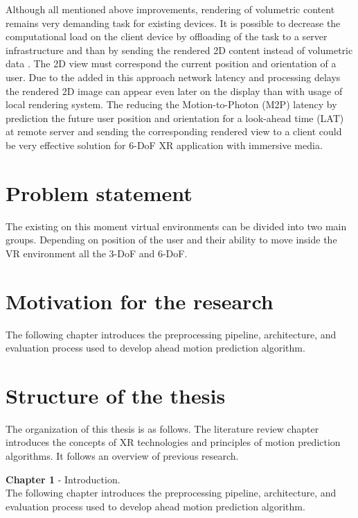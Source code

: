 Although all mentioned above improvements, rendering of volumetric content remains very demanding task for existing devices. It is possible to decrease the computational load on the client device by offloading of the task to a server infrastructure and than by sending the rendered 2D content instead of volumetric data \cite{serhan_cloud_streaming}. The 2D view must correspond the current position and orientation of a user. Due to the added in this approach network latency and processing delays the rendered 2D image can appear even later on the display than with usage of local rendering system. The reducing the Motion-to-Photon (M2P) latency by prediction the future user position and orientation for a look-ahead time (LAT) at remote server and sending the corresponding rendered view to a client could be very effective solution for 6-DoF XR application with immersive media. 


\section{Problem statement}
\label{sec:intro:problem}
The existing on this moment virtual environments can be divided into two main groups. Depending on position of the user and their ability to move inside the VR environment all the 3-DoF and 6-DoF. 

\section{Motivation for the research}
\label{sec:intro:motivation}
The following chapter introduces the preprocessing pipeline, architecture, and evaluation process used to develop ahead motion prediction algorithm.


\section{Structure of the thesis}
\label{sec:intro:structure}
The organization of this thesis is as follows. The literature review chapter introduces the concepts of XR technologies and principles of motion prediction algorithms. It follows an overview of previous research. 

\textbf{Chapter 1} - Introduction.\\
The following chapter introduces the preprocessing pipeline, architecture, and evaluation process used to develop ahead motion prediction algorithm.




